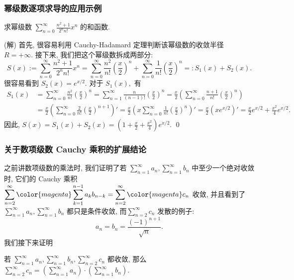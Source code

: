 \begin{frame}
\frametitle{幂级数逐项求导的应用示例}

\begin{eg}
求幂级数 $\displaystyle \sum_{n=0}^{\infty} \frac{n^2 + 1}{2^n n!} x^n$ 的和函数.
\end{eg}

\pause
\vspace{0.5em}

\startproof[bg=yellow, fg=red](解)
首先, 很容易利用 Cauchy-Hadamard 定理判断该幂级数的收敛半径 $R = +\infty.$ 接下来, 我们把这个幂级数拆成两部分:
\[
S(x) := \sum_{n=0}^{\infty} \frac{n^2 + 1}{2^n n!} x^n = \sum_{n=0}^{\infty} \frac{n^2}{n!} \left( \frac{x}{2} \right)^n + \sum_{n=0}^{\infty} \frac{1}{n!} \left( \frac{x}{2} \right)^n =: S_1(x) + S_2(x).
\]
\pause
很容易看到 $S_2(x) = e^{x/2}.$ 对于 $S_1(x),$ 有
\begin{align*}
S_1(x) & = \sum_{n=0}^{\infty} \frac{n^2}{n!} \left( \frac{x}{2} \right)^n = \sum_{n=1}^{\infty} \frac{n}{(n-1)!} \left( \frac{x}{2} \right)^n = \frac{x}{2} \left( \sum_{n=0}^{\infty} \frac{n+1}{n!} \left( \frac{x}{2} \right)^n \right) \\
& = \frac{x}{2} \left( \sum_{n=0}^{\infty} \frac{2}{n!} \left( \frac{x}{2} \right)^{n+1} \right)' = \frac{x}{2} \left( x \sum_{n=0}^{\infty} \frac{1}{n!} \left( \frac{x}{2} \right)^n \right)' = \frac{x}{2} \left( x e^{x/2} \right)' = \frac{x}{2} e^{x/2} + \frac{x^2}{4} e^{x/2}.
\end{align*}
\pause
因此, $S(x) = S_1(x) + S_2(x) = \left( 1 + \frac{x}{2} + \frac{x^2}{4} \right) e^{x/2}.$
\qed

\end{frame}


\begin{frame}
\frametitle{关于数项级数 Cauchy 乘积的扩展结论}

之前讲数项级数的乘法时, 我们证明了若 $\displaystyle \sum\limits_{n=1}^{\infty} a_n, \sum\limits_{n=1}^{\infty} b_n$ 中至少一个绝对收敛时, 它们的 Cauchy 乘积 $\displaystyle \sum\limits_{n=2}^{\infty} {\color{magenta}\sum\limits_{k=1}^{n-1} a_k b_{n-k}} = \sum\limits_{n=2}^{\infty} {\color{magenta}c_n}$ 收敛, \pause
并且看到了 $\displaystyle \sum\limits_{n=1}^{\infty} a_n, \sum\limits_{n=1}^{\infty} b_n$ 都只是条件收敛, 而$\displaystyle \sum\limits_{n=2}^{\infty} c_n$ 发散的例子:
\[
a_n = b_n = \dfrac{(-1)^{n+1}}{\sqrt{n}}.
\]
\pause
我们接下来证明
\begin{prop}
若 $\displaystyle \sum\limits_{n=1}^{\infty} a_n, \sum\limits_{n=1}^{\infty} b_n, \sum\limits_{n=2}^{\infty} c_n$ 都收敛, 那么 $\displaystyle \sum\limits_{n=2}^{\infty} c_n = \left( \sum\limits_{n=1}^{\infty} a_n \right) \cdot \left( \sum\limits_{n=1}^{\infty} b_n \right).$
\end{prop}

\end{frame}

